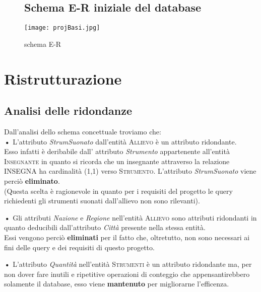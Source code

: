 \documentclass{article}
\begin{document}
\begin{landscape}
\begin{figure}
\subsection{Schema E-R iniziale del database}
\centering
\texttt{[image: projBasi.jpg]}
\hspace{1in}
\label{schema}
\caption{schema E-R}
\end{figure}
\end{landscape}

\newpage
\section{Ristrutturazione}\bigskip

\subsection{Analisi delle ridondanze}\medskip

Dall'analisi dello schema concettuale troviamo che:\medskip
\\
\textbf{•} L'attributo \emph{StrumSuonato} dall'entità \textsc{Allievo}
è un attributo ridondante.\\
Esso infatti è deribabile dall' attributo \emph{Strumento} appartenente all'entità \textsc{Insegnante} in quanto si ricorda che       
un insegnante attraverso la relazione INSEGNA ha cardinalità (1,1) verso \textsc{Strumento}. L'attributo \emph{StrumSuonato} viene perciò \textbf{eliminato}.\medskip
\\(Questa scelta è ragionevole in quanto per i requisiti del progetto le query richiedenti gli strumenti suonati dall'allievo non 	sono rilevanti).

\bigskip

\begin{flushleft}
\textbf{•} Gli attributi \emph{Nazione} e \emph{Regione} nell'entità \textsc{Allievo} sono attributi ridondanti in quanto deducibili dall'attributo \emph{Città} presente nella stessa entità.
\\Essi vengono perciò \textbf{eliminati} per il fatto che, oltretutto, non sono necessari ai fini delle query e dei requisiti di questo progetto. 
\end{flushleft}

\bigskip

\begin{flushleft}
\textbf{•} L'attributo \emph{Quantità} nell'entità \textsc{Strumenti} è un attributo ridondante ma, per non dover fare inutili e ripetitive operazioni di conteggio che appensantirebbero solamente il database, esso viene \textbf{mantenuto} per migliorarne l'efficenza.
\end{flushleft}
\end{document}
